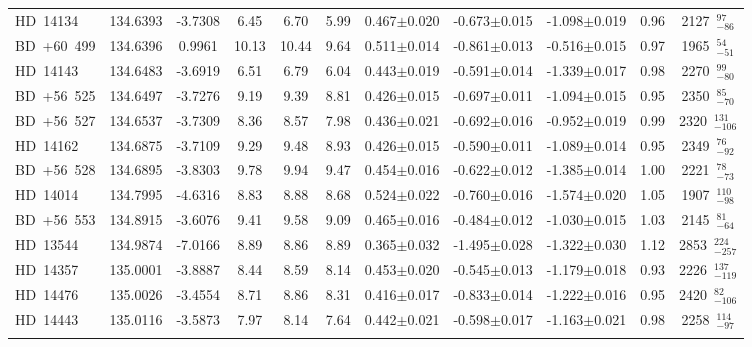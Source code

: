 {\begin{longtable}{lcccccccccc}
HD~14134 & 134.6393 & -3.7308 & 6.45 & 6.70 & 5.99 & 0.467$\pm$0.020 & -0.673$\pm$0.015 & -1.098$\pm$0.019 & 0.96 & 2127~$_{-86}^{97}$ \\
\noalign{\smallskip}
BD~+60~499 & 134.6396 & 0.9961 & 10.13 & 10.44 & 9.64 & 0.511$\pm$0.014 & -0.861$\pm$0.013 & -0.516$\pm$0.015 & 0.97 & 1965~$_{-51}^{54}$ \\
\noalign{\smallskip}
HD~14143 & 134.6483 & -3.6919 & 6.51 & 6.79 & 6.04 & 0.443$\pm$0.019 & -0.591$\pm$0.014 & -1.339$\pm$0.017 & 0.98 & 2270~$_{-80}^{99}$ \\
\noalign{\smallskip}
BD~+56~525 & 134.6497 & -3.7276 & 9.19 & 9.39 & 8.81 & 0.426$\pm$0.015 & -0.697$\pm$0.011 & -1.094$\pm$0.015 & 0.95 & 2350~$_{-70}^{85}$ \\
\noalign{\smallskip}
BD~+56~527 & 134.6537 & -3.7309 & 8.36 & 8.57 & 7.98 & 0.436$\pm$0.021 & -0.692$\pm$0.016 & -0.952$\pm$0.019 & 0.99 & 2320~$_{-106}^{131}$ \\
\noalign{\smallskip}
HD~14162 & 134.6875 & -3.7109 & 9.29 & 9.48 & 8.93 & 0.426$\pm$0.015 & -0.590$\pm$0.011 & -1.089$\pm$0.014 & 0.95 & 2349~$_{-92}^{76}$ \\
\noalign{\smallskip}
BD~+56~528 & 134.6895 & -3.8303 & 9.78 & 9.94 & 9.47 & 0.454$\pm$0.016 & -0.622$\pm$0.012 & -1.385$\pm$0.014 & 1.00 & 2221~$_{-73}^{78}$ \\
\noalign{\smallskip}
HD~14014 & 134.7995 & -4.6316 & 8.83 & 8.88 & 8.68 & 0.524$\pm$0.022 & -0.760$\pm$0.016 & -1.574$\pm$0.020 & 1.05 & 1907~$_{-98}^{110}$ \\
\noalign{\smallskip}
BD~+56~553 & 134.8915 & -3.6076 & 9.41 & 9.58 & 9.09 & 0.465$\pm$0.016 & -0.484$\pm$0.012 & -1.030$\pm$0.015 & 1.03 & 2145~$_{-64}^{81}$ \\
\noalign{\smallskip}
HD~13544 & 134.9874 & -7.0166 & 8.89 & 8.86 & 8.89 & 0.365$\pm$0.032 & -1.495$\pm$0.028 & -1.322$\pm$0.030 & 1.12 & 2853~$_{-257}^{224}$ \\
\noalign{\smallskip}
HD~14357 & 135.0001 & -3.8887 & 8.44 & 8.59 & 8.14 & 0.453$\pm$0.020 & -0.545$\pm$0.013 & -1.179$\pm$0.018 & 0.93 & 2226~$_{-119}^{137}$ \\
\noalign{\smallskip}
HD~14476 & 135.0026 & -3.4554 & 8.71 & 8.86 & 8.31 & 0.416$\pm$0.017 & -0.833$\pm$0.014 & -1.222$\pm$0.016 & 0.95 & 2420~$_{-106}^{82}$ \\
\noalign{\smallskip}
HD~14443 & 135.0116 & -3.5873 & 7.97 & 8.14 & 7.64 & 0.442$\pm$0.021 & -0.598$\pm$0.017 & -1.163$\pm$0.021 & 0.98 & 2258~$_{-97}^{114}$ \\
\noalign{\smallskip}

\end{longtable}}
